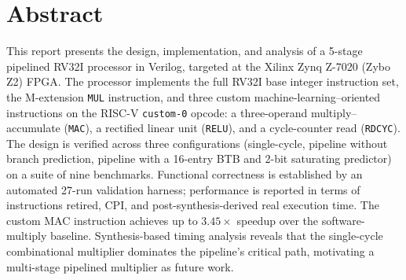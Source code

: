 \chapter*{Abstract}
\thispagestyle{empty}

This report presents the design, implementation, and analysis of a 5-stage
pipelined RV32I processor in Verilog, targeted at the Xilinx Zynq Z-7020
(Zybo Z2) FPGA. The processor implements the full RV32I base integer
instruction set, the M-extension \texttt{MUL} instruction, and three custom
machine-learning–oriented instructions on the RISC-V \texttt{custom-0}
opcode: a three-operand multiply--accumulate (\texttt{MAC}), a rectified
linear unit (\texttt{RELU}), and a cycle-counter read (\texttt{RDCYC}).
The design is verified across three configurations
(single-cycle, pipeline without branch prediction, pipeline with a
16-entry BTB and 2-bit saturating predictor) on a suite of nine
benchmarks. Functional correctness is established by an automated
27-run validation harness; performance is reported in terms of
instructions retired, CPI, and post-synthesis-derived real execution
time. The custom MAC instruction achieves up to $3.45\times$ speedup
over the software-multiply baseline. Synthesis-based timing analysis
reveals that the single-cycle combinational multiplier dominates the
pipeline's critical path, motivating a multi-stage pipelined multiplier
as future work.

\clearpage
